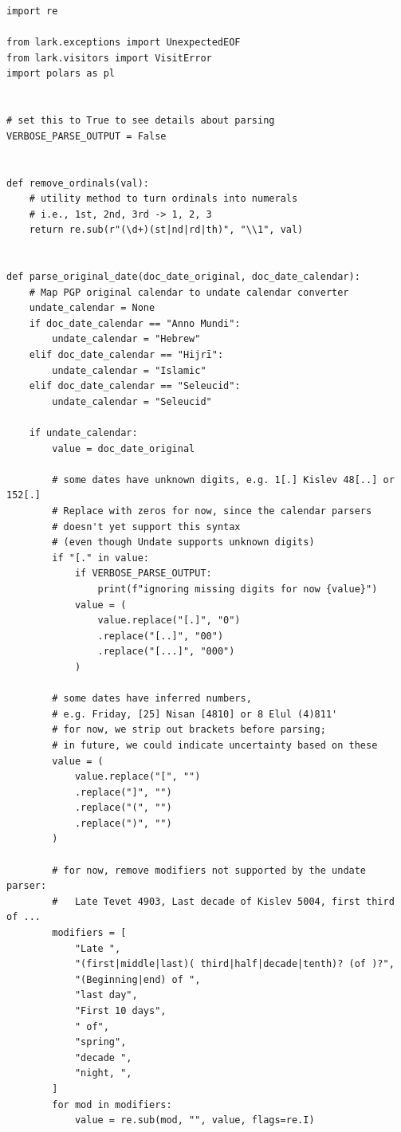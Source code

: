 \documentclass{anthology-ch}         %
\begin{document}
\begin{verbatim}
import re

from lark.exceptions import UnexpectedEOF
from lark.visitors import VisitError
import polars as pl


# set this to True to see details about parsing
VERBOSE_PARSE_OUTPUT = False


def remove_ordinals(val):
    # utility method to turn ordinals into numerals
    # i.e., 1st, 2nd, 3rd -> 1, 2, 3
    return re.sub(r"(\d+)(st|nd|rd|th)", "\\1", val)


def parse_original_date(doc_date_original, doc_date_calendar):
    # Map PGP original calendar to undate calendar converter
    undate_calendar = None
    if doc_date_calendar == "Anno Mundi":
        undate_calendar = "Hebrew"
    elif doc_date_calendar == "Hijrī":
        undate_calendar = "Islamic"
    elif doc_date_calendar == "Seleucid":
        undate_calendar = "Seleucid"

    if undate_calendar:
        value = doc_date_original

        # some dates have unknown digits, e.g. 1[.] Kislev 48[..] or 152[.]
        # Replace with zeros for now, since the calendar parsers
        # doesn't yet support this syntax
        # (even though Undate supports unknown digits)
        if "[." in value:
            if VERBOSE_PARSE_OUTPUT:
                print(f"ignoring missing digits for now {value}")
            value = (
                value.replace("[.]", "0")
                .replace("[..]", "00")
                .replace("[...]", "000")
            )

        # some dates have inferred numbers, 
        # e.g. Friday, [25] Nisan [4810] or 8 Elul (4)811'
        # for now, we strip out brackets before parsing;
        # in future, we could indicate uncertainty based on these
        value = (
            value.replace("[", "")
            .replace("]", "")
            .replace("(", "")
            .replace(")", "")
        )

        # for now, remove modifiers not supported by the undate parser:
        #   Late Tevet 4903, Last decade of Kislev 5004, first third of ...
        modifiers = [
            "Late ",
            "(first|middle|last)( third|half|decade|tenth)? (of )?",
            "(Beginning|end) of ",
            "last day",
            "First 10 days",
            " of",
            "spring",
            "decade ",
            "night, ",
        ]
        for mod in modifiers:
            value = re.sub(mod, "", value, flags=re.I)


\end{verbatim}
\end{document}

